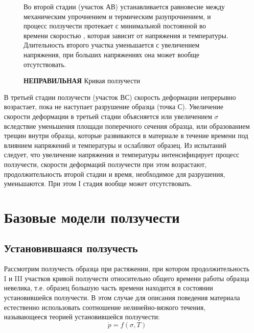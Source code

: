 	\begin{figure}[h!]
		\begin{minipage}[h]{0.48\linewidth}
			\caption{ \textbf{НЕПРАВИЛЬНАЯ} Кривая ползучести} 
		\end{minipage}
		\hfill
		\begin{minipage}[h]{0.48\linewidth}
Во второй стадии (участок АВ) устанавливается равновесие между механическим 
упрочнением и термическим разупрочнением, и процесс ползучести протекает с 	минимальной 
постоянной во времени скоростью , которая зависит от напряжения и 
температуры. Длительность второго участка уменьшается с увеличением напряжения, при 
больших напряжениях она может вообще отсутствовать.
		
		\end{minipage}
		\label{intro_creep}
	\end{figure}
		
В третьей стадии ползучести (участок ВС) скорость деформации непрерывно возрастает, пока 
не наступает разрушение образца (точка С).
Увеличение скорости деформации в третьей стадии объясняется или увеличением $\sigma$ 
вследствие уменьшения площади поперечного сечения образца, или образованием трещин внутри 
образца, которые развиваются в материале в течение времени под влиянием напряжений и 
температуры и ослабляют образец.
Из испытаний следует, что увеличение напряжения и температуры интенсифицирует процесс 
ползучести, скорости деформаций ползучести при этом возрастают, продолжительность второй 
стадии и время, необходимое для разрушения, уменьшаются. При этом I стадия вообще может 
отсутствовать.

\section{Базовые модели ползучести}

\subsection{Установившаяся ползучесть}
Рассмотрим ползучесть образца при растяжении, при котором продолжительность I и III участков кривой ползучести относительно общего времени работы образца невелика, т.е. образец большую часть времени находится в состоянии установившейся ползучести. 
В этом случае для описания поведения материала естественно использовать соотношение нелинейно-вязкого течения, называющееся теорией установившейся ползучести:
 \begin{equation}
 	\dot{p} = f(\sigma, T)
 \end{equation}
 
